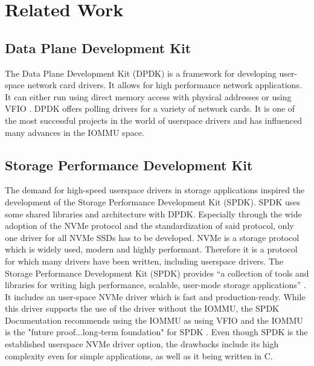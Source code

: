 \chapter{Related Work}

\section{Data Plane Development Kit}
The Data Plane Development Kit (DPDK) is a framework for developing user-space network card drivers. It allows for high performance network applications. It can either run using direct memory access with physical addresses or using VFIO \cite{aboutdpdk}. DPDK offers polling drivers for a variety of network cards.
It is one of the most successful projects in the world of userspace drivers and has influenced many advances in the IOMMU space.

\section{Storage Performance Development Kit}
The demand for high-speed userspace drivers in storage applications inspired the development of the Storage Performance Development Kit (SPDK). SPDK uses some shared libraries and architecture with DPDK. Especially through the wide adoption of the NVMe protocol and the standardization of said protocol, only one driver for all NVMe SSDs has to be developed.
NVMe is a storage protocol which is widely used, modern and highly performant. Therefore it is a protocol for which many drivers have been written, including userspace drivers. The Storage Performance Development Kit (SPDK) provides ``a collection of tools and libraries for writing high performance, scalable, user-mode storage applications'' \cite{spdkindex}. It includes an user-space NVMe driver which is fast and production-ready. While this driver supports the use of the driver without the IOMMU, the SPDK Documentation recommends using the IOMMU as using VFIO and the IOMMU is the "future proof...long-term foundation" for SPDK \cite{spdkmemory}. Even though SPDK is the established userspace NVMe driver option, the drawbacks include its high complexity even for simple applications, as well as it being written in C.


